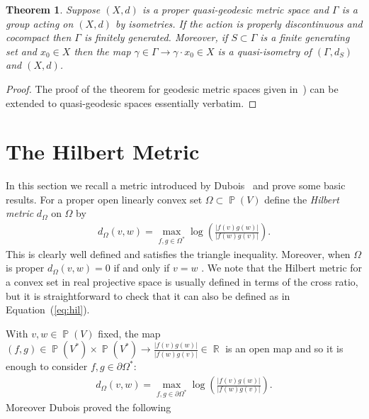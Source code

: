 \documentclass[12pt]{amsart}
\theoremstyle{plain}
\newtheorem{theorem}[proposition]{Theorem}
\theoremstyle{definition}
\theoremstyle{remark}
\begin{document}
\begin{theorem}
\label{thm:fundgeomgp}
Suppose $(X,d)$ is a proper quasi-geodesic metric space and $\Gamma$ is a group acting on $(X,d)$ by isometries. If the action is properly discontinuous and cocompact then $\Gamma$ is finitely generated. Moreover, if $S \subset \Gamma$ is a finite generating set and $x_0 \in X$ then the map $\gamma \in \Gamma \rightarrow \gamma \cdot x_0 \in X$ is a quasi-isometry of $(\Gamma,d_S)$ and $(X,d)$.
\end{theorem}

\begin{proof}
The proof of the theorem for geodesic metric spaces given in~\cite[Chapter IV, Theorem 23]{dlP2000}) can be extended to quasi-geodesic spaces essentially verbatim.
\end{proof}

\section{The Hilbert Metric}\label{sec:Hilbert}

In this section we recall a metric introduced by Dubois~\cite{D2009} and prove some basic results. For a proper open linearly convex set $\Omega \subset \operatorname{\mathbb{P}}(V)$ define the \emph{Hilbert metric} $d_\Omega$ on $\Omega$ by 
\begin{align}
\label{eq:hil}
d_{\Omega}(v,w) = \max_{f,g \in \Omega^*} \log \left( \frac{{\left|{f(v)g(w)}\right|}}{{\left|{f(w)g(v)}\right|}} \right).
\end{align}
This is clearly well defined and satisfies the triangle inequality. Moreover, when $\Omega$ is proper $d_{\Omega}(v,w) = 0$ if and only if $v=w$ \cite[Lemma 2.1]{D2009}. We note that the Hilbert metric for a convex set in real projective space is usually defined in terms of the cross ratio, but it is straightforward to check that it can also be defined as in Equation~(\ref{eq:hil}).

With $v, w \in \operatorname{\mathbb{P}}(V)$ fixed, the map $(f,g) \in \operatorname{\mathbb{P}}(V^*) \times \operatorname{\mathbb{P}}(V^*) \rightarrow \frac{{\left|{f(v)g(w)}\right|}}{{\left|{f(w)g(v)}\right|}} \in \operatorname{\mathbb{R}}$ is an open map and so it is enough to consider $f,g \in \partial \Omega^*$:
\begin{align*}
d_{\Omega}(v,w) = \max_{f,g \in \partial\Omega^*} \log \left( \frac{{\left|{f(v)g(w)}\right|}}{{\left|{f(w)g(v)}\right|}} \right).
\end{align*}
Moreover Dubois proved the following
\end{document}
